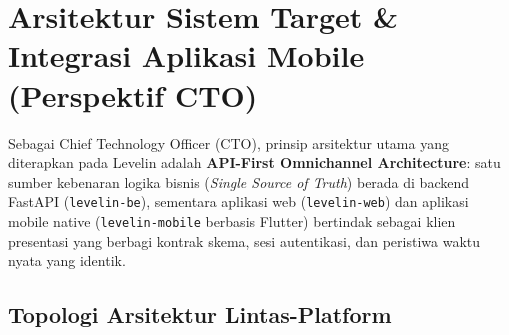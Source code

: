 \documentclass[11pt,a4paper]{report}
\begin{document}
\chapter{Arsitektur Sistem Target \& Integrasi Aplikasi Mobile (Perspektif CTO)}

Sebagai Chief Technology Officer (CTO), prinsip arsitektur utama yang diterapkan pada Levelin adalah \textbf{API-First Omnichannel Architecture}: satu sumber kebenaran logika bisnis (\textit{Single Source of Truth}) berada di backend FastAPI (\texttt{levelin-be}), sementara aplikasi web (\texttt{levelin-web}) dan aplikasi mobile native (\texttt{levelin-mobile} berbasis Flutter) bertindak sebagai klien presentasi yang berbagi kontrak skema, sesi autentikasi, dan peristiwa waktu nyata yang identik.

\section{Topologi Arsitektur Lintas-Platform}
\end{document}
